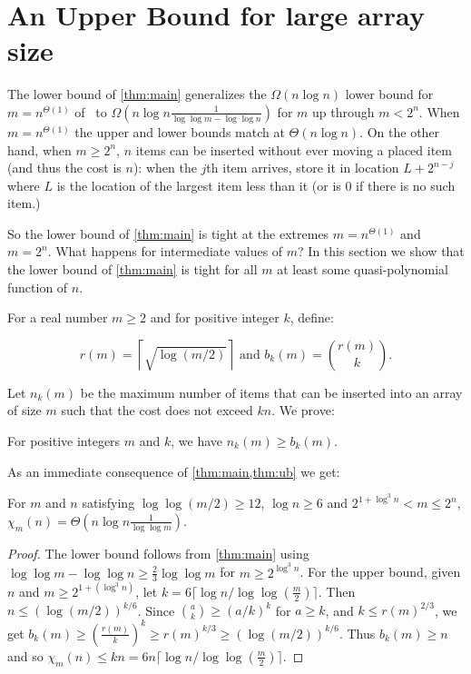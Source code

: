 \documentclass[unicode,review]{siamart1116}
\numberwithin{theorem}{section}
\begin{document}
\section{An Upper Bound for large array size}
\label{s-ub}

The lower bound of \cref{thm:main} generalizes the $\Omega(n \log n)$ lower bound 
for $m=n^{\Theta(1)}$ of~\cite{DSZ04} to  $\Omega(n\log n \frac{1}{\log\log m -\log\log n})$  for  $m$ up through $m<2^n$.   
When $m=n^{\Theta(1)}$ the upper and lower bounds match at $\Theta(n \log n)$.  On the other hand, when
$m \geq 2^n$,  $n$ items can be inserted without ever moving a placed item (and thus the cost is $n$):
when the $j$th item arrives, 
store it in location $L+2^{n-j}$ where $L$ is the location of the largest item less than it
(or is 0 if there is no such item.)

So the lower bound of \cref{thm:main} is tight at the extremes $m=n^{\Theta(1)}$ and $m=2^n$.  What happens for intermediate values of $m$?
In this section we show that the  lower bound of \cref{thm:main} is tight for all $m$ at least some quasi-polynomial function of $n$.  

For a real number $m \geq 2$ and for positive integer $k$, define:

\[
r(m) = \left\lceil \sqrt{\log(m/2)}  \right\rceil \text{ and } 
b_k(m)  =  \binom{r(m)}{k}.
\]


Let $n_k(m)$ be the maximum number of items that can be inserted into an array of size $m$ such that the cost does not exceed $kn$. We prove:

\begin{theorem}
\label{thm:ub}
For positive integers $m$ and $k$, we have $n_k(m) \geq b_k(m)$. 
\end{theorem}

As an immediate consequence of \cref{thm:main,thm:ub} we get:

\begin{corollary}
For $m$ and $n$ satisfying $\log \log (m/2) \ge 12$, $\log n \ge 6$ and $2^{1+\log^3 n} < m \leq 2^n$, $\chi_m(n) = \Theta(n \log n \frac{1}{\log\log m})$.
\end{corollary}

\begin{proof}
The lower bound follows from \cref{thm:main} using $\log\log m - \log\log n \geq \frac{2}{3} \log\log m$
for   $m\geq 2^{\log^3 n}$.
For the upper bound, given $n$ and $m \geq 2^{1+(\log^3 n)}$, let $k= 6\lceil \log n/\log\log (\frac{m}{2}) \rceil$.
Then $n \leq (\log (m/2))^{k/6}$. Since $\binom{a}{k} \geq (a/k)^k$ for $a\ge k$,   
and $k \leq r(m)^{2/3}$, we get
$b_k(m) \geq (\frac{r(m)}{k})^k \geq r(m)^{k/3} \geq (\log (m/2))^{k/6}$. Thus $b_k(m) \ge n$ and so
$\chi_m(n) \leq  k n = 6 n \lceil \log n/\log\log (\frac{m}{2}) \rceil $. 
\end{proof}
\end{document}
